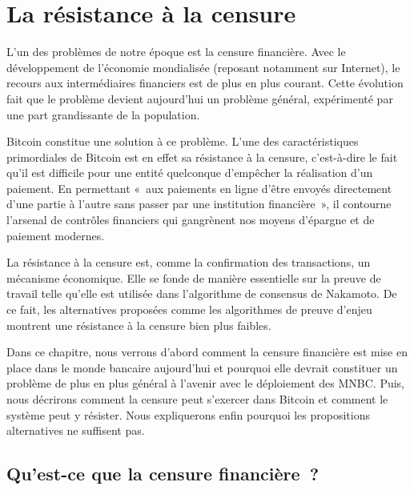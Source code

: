 
\chapter{La résistance à la censure}
\label{ch:censure}

L'un des problèmes de notre époque est la censure financière. Avec le développement de l'économie mondialisée (reposant notamment sur Internet), le recours aux intermédiaires financiers est de plus en plus courant. Cette évolution fait que le problème devient aujourd'hui un problème général, expérimenté par une part grandissante de la population.

Bitcoin constitue une solution à ce problème. L'une des caractéristiques primordiales de Bitcoin est en effet sa résistance à la censure, c'est-à-dire le fait qu'il est difficile pour une entité quelconque d'empêcher la réalisation d'un paiement. En permettant «~aux paiements en ligne d'être envoyés directement d'une partie à l'autre sans passer par une institution financière~», il contourne l'arsenal de contrôles financiers qui gangrènent nos moyens d'épargne et de paiement modernes.

La résistance à la censure est, comme la confirmation des transactions, un mécanisme économique. Elle se fonde de manière essentielle sur la preuve de travail telle qu'elle est utilisée dans l'algorithme de consensus de Nakamoto. De ce fait, les alternatives proposées comme les algorithmes de preuve d'enjeu montrent une résistance à la censure bien plus faibles.

Dans ce chapitre, nous verrons d'abord comment la censure financière est mise en place dans le monde bancaire aujourd'hui et pourquoi elle devrait constituer un problème de plus en plus général à l'avenir avec le déploiement des MNBC. Puis, nous décrirons comment la censure peut s'exercer dans Bitcoin et comment le système peut y résister. Nous expliquerons enfin pourquoi les propositions alternatives ne suffisent pas.

\section*{Qu'est-ce que la censure financière~?}

%

